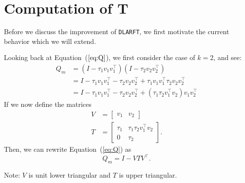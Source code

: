 \documentclass[12pt]{article}
\begin{document}
    \section{Computation of T}\label{sec:larft}
    Before we discuss the improvement of \verb|DLARFT|, we first motivate the current behavior which we will
    extend.
    
    Looking back at Equation~($\ref{eq:Q}$), we first consider the case of $k=2$, and see:
    \begin{align*}
        Q_m &= \left(I - \tau_1v_1v_1^\top\right)\left(I - \tau_2v_2v_2^\top\right) \\
            &= I - \tau_1v_1v_1^\top - \tau_2v_2v_2^\top + \tau_1v_1v_1^\top\tau_2v_2v_2^\top \\
            &= I - \tau_1v_1v_1^\top - \tau_2v_2v_2^\top + \left(\tau_1\tau_2v_1^\top v_2\right)v_1v_2^\top
    \end{align*}
    If we now define the matrices
    \begin{align*}
        V &= \begin{bmatrix} v_1 & v_2 \end{bmatrix} \\
            T &= \begin{bmatrix} \tau_1 & \tau_1\tau_2v_1^\top v_2 \\
            0 & \tau_2\end{bmatrix}.
    \end{align*}
    Then, we can rewrite Equation~(\ref{eq:Q}) as 
    \begin{equation}\label{eq:blockedQ}
        Q_m = I - VTV^\top.
    \end{equation}

    Note: $V$ is unit lower triangular and $T$ is upper triangular.
\end{document}
